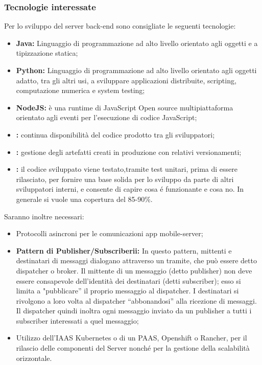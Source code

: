 	\subsubsection{Tecnologie interessate}
		Per lo sviluppo del server back-end sono consigliate le seguenti tecnologie:
		\begin{itemize}
			\item \textbf{Java:} Linguaggio di programmazione ad alto livello orientato agli oggetti e a tipizzazione statica;
			\item \textbf{Python:} Linguaggio di programmazione ad alto livello orientato agli oggetti adatto, tra gli altri usi, a sviluppare applicazioni distribuite, scripting, computazione numerica e system testing;
			\item \textbf{NodeJS:} è una runtime di JavaScript Open source multipiattaforma orientato agli eventi per l'esecuzione di codice JavaScript;
			\item \textbf{:} continua disponibilità del codice prodotto tra gli sviluppatori;
			\item \textbf{:} gestione degli artefatti creati in produzione con relativi versionamenti;
			\item \textbf{:} il codice sviluppato viene testato,tramite test unitari, prima di essere rilasciato, per fornire una base solida per lo sviluppo da parte di altri sviluppatori interni, e consente di capire cosa é funzionante e cosa no. In generale si vuole una copertura del 85-90\%.
		\end{itemize}
		Saranno inoltre necessari:
		\begin{itemize}
			\item Protocolli asincroni per le comunicazioni app mobile-server;
			\item \textbf{Pattern di Publisher/Subscriberii:} In questo pattern, mittenti e destinatari di messaggi dialogano attraverso un tramite, che può essere detto dispatcher o broker. Il mittente di un messaggio (detto publisher) non deve essere consapevole dell'identità dei destinatari (detti subscriber); esso si limita a "pubblicare'' il proprio messaggio al dispatcher. I destinatari si rivolgono a loro volta al dispatcher ``abbonandosi'' alla ricezione di messaggi. Il dispatcher quindi inoltra ogni messaggio inviato da un publisher a tutti i subscriber interessati a quel messaggio;
			\item Utilizzo dell’IAAS Kubernetes o di un PAAS, Openshift o Rancher, per il rilascio delle componenti del Server nonché per la gestione della scalabilità orizzontale.
		\end{itemize}

